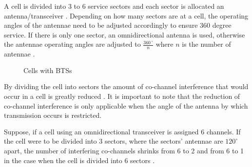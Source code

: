 A cell is divided into 3 to 6 service sectors and each sector is allocated an antenna/transceiver \cite{GSMSysEngin}. Depending on how many sectors are at a cell, the operating angles of the antennae need to be adjusted accordingly to ensure 360 degree service. If there is only one sector, an omnidirectional antenna is used, otherwise the antennae operating angles are adjusted to $\frac{360\,^{\circ}}{n}$ where ${n}$ is the number of antennae \cite{Eisenblatter}.
\begin{figure}[t!]
	\begin{centering}
		
		\caption{Cells with BTSs}
		\label{fig:GSMCell}
	\end{centering}
\end{figure}

By dividing the cell into sectors the amount of co-channel interference that would occur in a cell is greatly reduced \cite{GSMArchitectureProtocolsServices}. It is important to note that the reduction of co-channel interference is only applicable when the angle of the antenna by which transmission occurs is restricted\cite{GSMArchitectureProtocolsServices}.

Suppose, if a cell using an omnidirectional transceiver is assigned 6 channels. If the cell were to be divided into 3 sectors, where the sectors' antennae are $120^\circ$ apart, the number of interfering co-channels shrinks from 6 to 2 and from 6 to 1 in the case when the cell is divided into 6 sectors \cite{GSMSysEngin,GSM92,GSMArchitectureProtocolsServices}.


